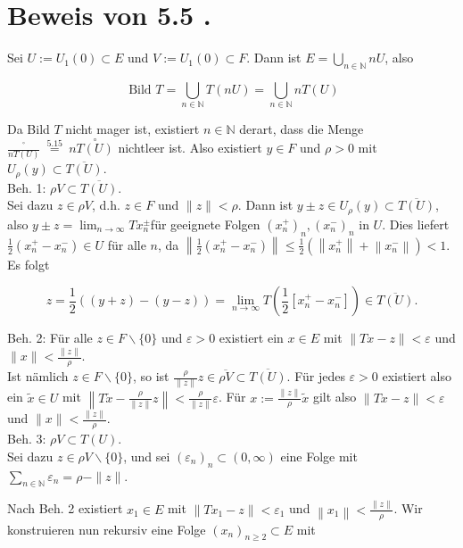 \documentclass[10pt, letterpaper]{article}
\begin{document}
\section*{Beweis von 5.5 .}
Sei $U:=U_{1}(0) \subset E$ und $V:=U_{1}(0) \subset F$. Dann ist $E=\bigcup_{n \in \mathbb{N}} n U$, also

$$
\text { Bild } T=\bigcup_{n \in \mathbb{N}} T(n U)=\bigcup_{n \in \mathbb{N}} n T(U)
$$

Da Bild $T$ nicht mager ist, existiert $n \in \mathbb{N}$ derart, dass die Menge $\frac{{ }^{\circ}}{n T(U)} \stackrel{\text { 5.15 }}{=} n \stackrel{\circ}{T(U)}$ nichtleer ist. Also existiert $y \in F$ und $\rho>0$ mit $U_{\rho}(y) \subset \overline{T(U)}$.\\
Beh. 1: $\rho V \subset \overline{T(U)}$.\\
Sei dazu $z \in \rho V$, d.h. $z \in F$ und $\|z\|<\rho$. Dann ist $y \pm z \in U_{\rho}(y) \subset \overline{T(U)}$, also $y \pm z=\lim _{n \rightarrow \infty} T x_{n}^{ \pm}$für geeignete Folgen $\left(x_{n}^{+}\right)_{n},\left(x_{n}^{-}\right)_{n}$ in $U$. Dies liefert $\frac{1}{2}\left(x_{n}^{+}-x_{n}^{-}\right) \in U$ für alle $n$, da $\left\|\frac{1}{2}\left(x_{n}^{+}-x_{n}^{-}\right)\right\| \leq \frac{1}{2}\left(\left\|x_{n}^{+}\right\|+\left\|x_{n}^{-}\right\|\right)<1$. Es folgt

$$
z=\frac{1}{2}((y+z)-(y-z))=\lim _{n \rightarrow \infty} T\left(\frac{1}{2}\left[x_{n}^{+}-x_{n}^{-}\right]\right) \in \overline{T(U)} .
$$

Beh. 2: Für alle $z \in F \backslash\{0\}$ und $\varepsilon>0$ existiert ein $x \in E$ mit $\|T x-z\|<\varepsilon$ und $\|x\|<\frac{\|z\|}{\rho}$.\\
Ist nämlich $z \in F \backslash\{0\}$, so ist $\frac{\rho}{\|z\|} z \in \overline{\rho V} \subset \overline{T(U)}$. Für jedes $\varepsilon>0$ existiert also ein $\tilde{x} \in U$ mit $\left\|T \tilde{x}-\frac{\rho}{\|z\|} z\right\|<\frac{\rho}{\|z\|} \varepsilon$. Für $x:=\frac{\|z\|}{\rho} \tilde{x}$ gilt also $\|T x-z\|<\varepsilon$ und $\|x\|<\frac{\|z\|}{\rho}$.\\
Beh. 3: $\rho V \subset T(U)$.\\
Sei dazu $z \in \rho V \backslash\{0\}$, und sei $\left(\varepsilon_{n}\right)_{n} \subset(0, \infty)$ eine Folge mit $\sum_{n \in \mathbb{N}} \varepsilon_{n}=\rho-\|z\|$.

Nach Beh. 2 existiert $x_{1} \in E$ mit $\left\|T x_{1}-z\right\|<\varepsilon_{1}$ und $\left\|x_{1}\right\|<\frac{\|z\|}{\rho}$. Wir konstruieren nun rekursiv eine Folge $\left(x_{n}\right)_{n \geq 2} \subset E$ mit
\end{document}
